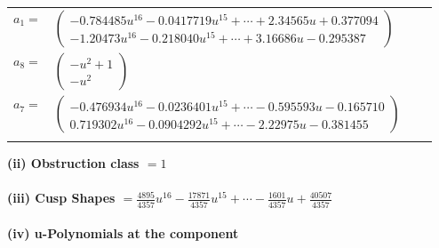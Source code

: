 \documentclass[1p]{elsarticle_modified}
\theoremstyle{definition}
\begin{document}
\begin{tabular}{m{7pt} m{180pt} m{7pt} m{180pt} }
\flushright $a_{1}=$&$\begin{pmatrix}-0.784485 u^{16}-0.0417719 u^{15}+\cdots+2.34565 u+0.377094\\-1.20473 u^{16}-0.218040 u^{15}+\cdots+3.16686 u-0.295387\end{pmatrix}$ \\
\flushright $a_{8}=$&$\begin{pmatrix}- u^2+1\\- u^2\end{pmatrix}$ \\
\flushright $a_{7}=$&$\begin{pmatrix}-0.476934 u^{16}-0.0236401 u^{15}+\cdots-0.595593 u-0.165710\\0.719302 u^{16}-0.0904292 u^{15}+\cdots-2.22975 u-0.381455\end{pmatrix}$\\&\end{tabular}
\flushleft \textbf{(ii) Obstruction class $= 1$}\\~\\
\flushleft \textbf{(iii) Cusp Shapes $= \frac{4895}{4357} u^{16}-\frac{17871}{4357} u^{15}+\cdots-\frac{1601}{4357} u+\frac{40507}{4357}$}\\~\\
\newpage\renewcommand{\arraystretch}{1}
\flushleft \textbf{(iv) u-Polynomials at the component}\newline \\
\end{document}
